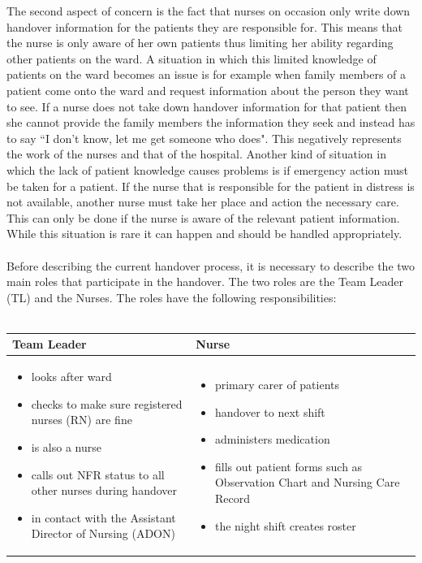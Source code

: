 \newpage
\noindent The second aspect of concern is the fact that nurses on occasion only write down handover information for the patients they are responsible for. This means that the nurse is only aware of her own patients thus limiting her ability regarding other patients on the ward. A situation in which this limited knowledge of patients on the ward becomes an issue is for example when family members of a patient come onto the ward and request information about the person they want to see. If a nurse does not take down handover information for that patient then she cannot provide the family members the information they seek and instead has to say ``I don't know, let me get someone who does". This negatively represents the work of the nurses and that of the hospital. Another kind of situation in which the lack of patient knowledge causes problems is if emergency action must be taken for a patient. If the nurse that is responsible for the patient in distress is not available, another nurse must take her place and action the necessary care. This can only be done if the nurse is aware of the relevant patient information. While this situation is rare it can happen and should be handled appropriately. 
\\ \\
Before describing the current handover process, it is necessary to describe the two main roles that participate in the handover. The two roles are the Team Leader (TL) and the Nurses. The roles have the following responsibilities: \\ \\

\hfil\begin{tabular}{|p{7cm}|p{7cm}|}
\hline
{\hfil\bf Team Leader} & {\hfil\bf Nurse} \\
\hline
\vspace{-5mm}\begin{itemize}
\item looks after ward
\item checks to make sure registered nurses (RN) are fine
\item is also a nurse
\item calls out \gls{NFR} status to all other nurses during handover
\item in contact with the Assistant Director of Nursing (ADON)
\end{itemize} & 
\vspace{-5mm}\begin{itemize}
\item primary carer of patients
\item handover to next shift
\item administers medication
\item fills out patient forms such as Observation Chart and Nursing Care Record
\item the night shift creates roster
\end{itemize} \\ 
\hline
\end{tabular}

